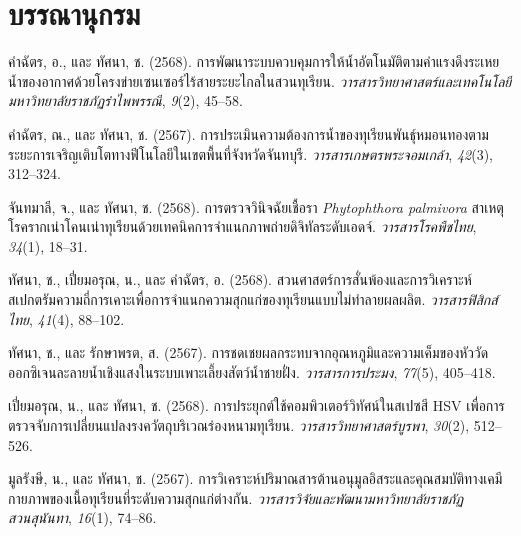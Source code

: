 \chapter*{บรรณานุกรม}

\noindent\hangindent=1.25cm
คำฉัตร, อ., และ ทัศนา, ช. (2568). การพัฒนาระบบควบคุมการให้น้ำอัตโนมัติตามค่าแรงดึงระเหยน้ำของอากาศด้วยโครงข่ายเซนเซอร์ไร้สายระยะไกลในสวนทุเรียน. \textit{วารสารวิทยาศาสตร์และเทคโนโลยี มหาวิทยาลัยราชภัฏรำไพพรรณี}, \textit{9}(2), 45--58.

\vspace{0.3cm}
\noindent\hangindent=1.25cm
คำฉัตร, ณ., และ ทัศนา, ช. (2567). การประเมินความต้องการน้ำของทุเรียนพันธุ์หมอนทองตามระยะการเจริญเติบโตทางฟีโนโลยีในเขตพื้นที่จังหวัดจันทบุรี. \textit{วารสารเกษตรพระจอมเกล้า}, \textit{42}(3), 312--324.

\vspace{0.3cm}
\noindent\hangindent=1.25cm
จันทมาลี, จ., และ ทัศนา, ช. (2568). การตรวจวินิจฉัยเชื้อรา \textit{Phytophthora palmivora} สาเหตุโรครากเน่าโคนเน่าทุเรียนด้วยเทคนิคการจำแนกภาพถ่ายดิจิทัลระดับเอดจ์. \textit{วารสารโรคพืชไทย}, \textit{34}(1), 18--31.

\vspace{0.3cm}
\noindent\hangindent=1.25cm
ทัศนา, ช., เปี่ยมอรุณ, น., และ คำฉัตร, อ. (2568). สวนศาสตร์การสั่นพ้องและการวิเคราะห์สเปกตรัมความถี่การเคาะเพื่อการจำแนกความสุกแก่ของทุเรียนแบบไม่ทำลายผลผลิต. \textit{วารสารฟิสิกส์ไทย}, \textit{41}(4), 88--102.

\vspace{0.3cm}
\noindent\hangindent=1.25cm
ทัศนา, ช., และ รักษาพรต, ส. (2567). การชดเชยผลกระทบจากอุณหภูมิและความเค็มของหัววัดออกซิเจนละลายน้ำเชิงแสงในระบบเพาะเลี้ยงสัตว์น้ำชายฝั่ง. \textit{วารสารการประมง}, \textit{77}(5), 405--418.

\vspace{0.3cm}
\noindent\hangindent=1.25cm
เปี่ยมอรุณ, น., และ ทัศนา, ช. (2568). การประยุกต์ใช้คอมพิวเตอร์วิทัศน์ในสเปซสี HSV เพื่อการตรวจจับการเปลี่ยนแปลงรงควัตถุบริเวณร่องหนามทุเรียน. \textit{วารสารวิทยาศาสตร์บูรพา}, \textit{30}(2), 512--526.

\vspace{0.3cm}
\noindent\hangindent=1.25cm
มูลรังษี, น., และ ทัศนา, ช. (2567). การวิเคราะห์ปริมาณสารต้านอนุมูลอิสระและคุณสมบัติทางเคมีกายภาพของเนื้อทุเรียนที่ระดับความสุกแก่ต่างกัน. \textit{วารสารวิจัยและพัฒนามหาวิทยาลัยราชภัฏสวนสุนันทา}, \textit{16}(1), 74--86.



